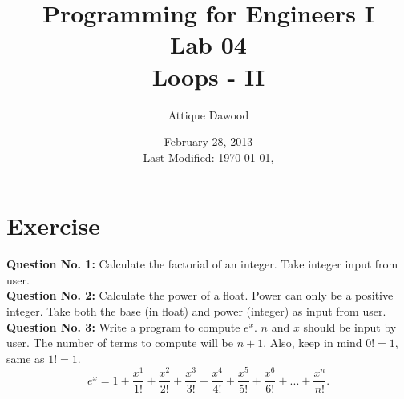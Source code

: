 \documentclass[12pt,a4paper]{article}
\title{\vspace{-1cm}Programming for Engineers I\\Lab 04\\Loops - II}
\author{Attique Dawood}
\date{February 28, 2013\\[0.2cm] Last Modified: \today, \currenttime}
\begin{document}
\maketitle

\section{Exercise}
\textbf{Question No. 1:} Calculate the factorial of an integer. Take integer input from user.\\
\noindent\textbf{Question No. 2:} Calculate the power of a float. Power can only be a positive integer. Take both the base (in float) and power (integer) as input from user.\\
\noindent\textbf{Question No. 3:} Write a program to compute $e^x$. $n$ and $x$ should be input by user. The number of terms to compute will be $n+1$. Also, keep in mind $0! = 1$, same as $1! = 1$.
\begin{equation}
e^x = 1+\dfrac{x^1}{1!}+\dfrac{x^2}{2!}+\dfrac{x^3}{3!}+\dfrac{x^4}{4!}+\dfrac{x^5}{5!}+\dfrac{x^6}{6!}+...+\dfrac{x^n}{n!}.
\label{eq:ex-Taylor-Series}
\end{equation}
\end{document}
